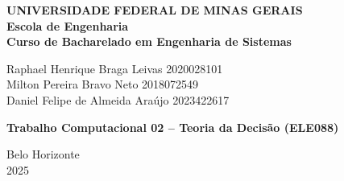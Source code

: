 \begin{center}
\textbf{UNIVERSIDADE FEDERAL DE MINAS GERAIS\\
Escola de Engenharia \\
Curso de Bacharelado em Engenharia de Sistemas}

\vspace{4cm}

Raphael Henrique Braga Leivas 2020028101 \\
Milton Pereira Bravo Neto 2018072549 \\
Daniel Felipe de Almeida Araújo 2023422617

\vspace{4cm}  

{ \textbf{Trabalho Computacional 02 – Teoria da Decisão (ELE088)} }

\vfill
{Belo Horizonte \\
2025 }
\end{center}

\newpage
